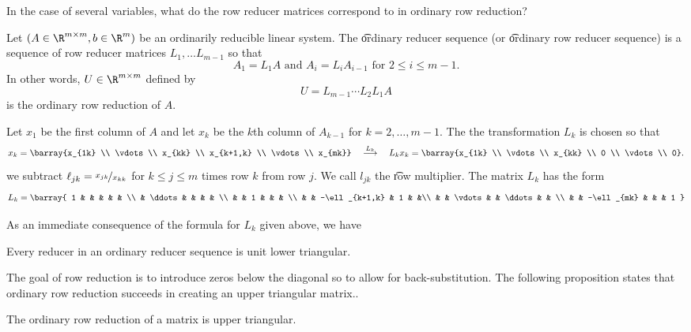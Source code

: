 

In the case of several variables, what do the row reducer matrices correspond to in ordinary row reduction?


Let $(A \in \R^{m \times m}, b \in \R^{m})$ be an ordinarily reducible linear system.
The \t{ordinary reducer sequence} (or \t{ordinary row reducer sequence}) is a sequence of row reducer matrices $L_{1}, \dots L_{m-1}$ so that
\[
  A_1 = L_1A \text{ and } A_i = L_iA_{i-1} \text{ for } 2 \leq i \leq m-1.
\]
In other words, $U \in \R^{m \times m}$ defined by
\[
  U = L_{m-1} \cdots L_2 L_1 A
\]
is the ordinary row reduction of $A$.


Let $x_1$ be the first column of $A$ and let $x_k$ be the $k$th column of $A_{k-1}$ for $k = 2, \dots, m-1$.
The the transformation $L_k$ is chosen so that
\[
  x_k = \barray{x_{1k} \\ \vdots \\ x_{kk} \\ x_{k+1,k} \\ \vdots \\ x_{mk}} \quad \overset{L_k}{\longrightarrow} \quad L_kx_k = \barray{x_{1k} \\ \vdots \\ x_{kk} \\ 0 \\ \vdots \\ 0}.
\]
we subtract $\ell_{jk} = \nicefrac{x_{jk}}{x_{kk}}$ for $k \leq j \leq m$ times row $k$ from row $j$.
We call $l_{jk}$ the \t{row multiplier}.
The matrix $L_k$ has the form
\[
  L_k = \barray{
    1 & & & &  & \\
    & \ddots & & & & \\
    & & 1 & & & \\
    & & -\ell_{k+1,k} & 1 & &\\
    & & \vdots & & \ddots & & \\
    & & -\ell_{mk} & & & 1
  }
\]


As an immediate consequence of the formula for $L_k$ given above, we have
\begin{proposition}
  Every reducer in an ordinary reducer sequence is unit lower triangular.
\end{proposition}

The goal of row reduction is to introduce zeros below the diagonal so to allow for back-substitution.
The following proposition states that ordinary row reduction succeeds in creating an upper triangular matrix..
\begin{proposition}
  The ordinary row reduction of a matrix is upper triangular.
\end{proposition}
